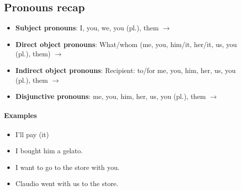 \subsection{Pronouns recap}

\begin{itemize}
  \item \textbf{Subject pronouns}: I, you, we, you (pl.), them $\rightarrow$ 
  \item \textbf{Direct object pronouns}: What/whom (me, you, him/it, her/it, us, you (pl.), them) $\rightarrow$ 
  \item \textbf{Indirect object pronouns}: Recipient: to/for me, you, him, her, us, you (pl.), them $\rightarrow$ 
  \item \textbf{Disjunctive pronouns}: me, you, him, her, us, you (pl.), them $\rightarrow$ 
\end{itemize}

\paragraph{Examples}
\begin{itemize}
  \item {I'll pay (it)} \\

  \item {I bought him a gelato.} \\

  \item{I want to go to the store with you.} \\

  \item{Claudio went with us to the store.} \\
\end{itemize}

